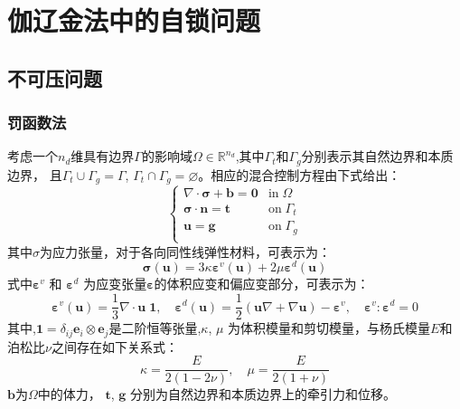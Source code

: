 \chapter{伽辽金法中的自锁问题}
\section{不可压问题}               
\subsection{罚函数法}
考虑一个$n_d$维具有边界$\Gamma$的影响域$\Omega\in \mathbb R^{n_d}$,其中$\Gamma_t$和$\Gamma_g$分别表示其自然边界和本质边界，
且$\Gamma_t \cup \Gamma_g = \Gamma$, $\Gamma_t \cap \Gamma_g = \varnothing$。相应的混合控制方程由下式给出：
\begin{equation}\label{strong_penalty}
    \begin{cases}
        \nabla \cdot \boldsymbol \sigma + \boldsymbol b = \boldsymbol 0 & \mathrm{in} \; \Omega \\
        \boldsymbol \sigma \cdot \boldsymbol n = \boldsymbol t & \mathrm{on} \; \Gamma_t \\
        \boldsymbol u = \boldsymbol g & \mathrm{on} \; \Gamma_g \\
\end{cases}
\end{equation}
其中$\sigma$为应力张量，对于各向同性线弹性材料，可表示为：
\begin{equation}\label{stress_penalty}
    \boldsymbol \sigma(\boldsymbol u) = 3\kappa \boldsymbol \varepsilon^v(\boldsymbol u) + 2\mu \boldsymbol \varepsilon^d(\boldsymbol u) 
\end{equation}
式中$\boldsymbol \varepsilon^v$ 和 $\boldsymbol \varepsilon^d$ 为应变张量$\boldsymbol \varepsilon$的体积应变和偏应变部分，可表示为：
\begin{equation}
    \boldsymbol \varepsilon^v(\boldsymbol u) =\frac{1}{3} \nabla \cdot \boldsymbol u \; \boldsymbol 1, \quad
    \boldsymbol \varepsilon^d(\boldsymbol u) =\frac{1}{2}(\boldsymbol u \nabla + \nabla \boldsymbol u) - \boldsymbol \varepsilon^v, \quad
    \boldsymbol \varepsilon^v : \boldsymbol \varepsilon^d = 0
\end{equation}
其中,$\boldsymbol 1 = \delta_{ij} \boldsymbol e_i \otimes \boldsymbol e_j$是二阶恒等张量,$\kappa$, $\mu$ 为体积模量和剪切模量，与杨氏模量$E$和泊松比$\nu$之间存在如下关系式：
\begin{equation}\label{modulus}
    \kappa = \frac{E}{2(1-2\nu)}, \quad \mu = \frac{E}{2(1+\nu)}
\end{equation}
$\boldsymbol b$为$\Omega$中的体力， $\boldsymbol t$, $\boldsymbol g$ 分别为自然边界和本质边界上的牵引力和位移。

